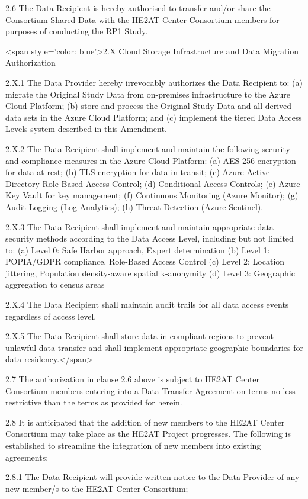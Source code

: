 \documentclass[12pt,letterpaper]{article}
\begin{document}
2.6	The Data Recipient is hereby authorised to transfer and/or share the Consortium Shared Data with the HE2AT Center Consortium members for purposes of conducting the RP1 Study. 

<span style='color: blue'>2.X Cloud Storage Infrastructure and Data Migration Authorization

2.X.1 The Data Provider hereby irrevocably authorizes the Data Recipient to: (a) migrate the Original Study Data from on-premises infrastructure to the Azure Cloud Platform; (b) store and process the Original Study Data and all derived data sets in the Azure Cloud Platform; and (c) implement the tiered Data Access Levels system described in this Amendment.

2.X.2 The Data Recipient shall implement and maintain the following security and compliance measures in the Azure Cloud Platform: (a) AES-256 encryption for data at rest; (b) TLS encryption for data in transit; (c) Azure Active Directory Role-Based Access Control; (d) Conditional Access Controls; (e) Azure Key Vault for key management; (f) Continuous Monitoring (Azure Monitor); (g) Audit Logging (Log Analytics); (h) Threat Detection (Azure Sentinel).

2.X.3 The Data Recipient shall implement and maintain appropriate data security methods according to the Data Access Level, including but not limited to: (a) Level 0: Safe Harbor approach, Expert determination (b) Level 1: POPIA/GDPR compliance, Role-Based Access Control (c) Level 2: Location jittering, Population density-aware spatial k-anonymity (d) Level 3: Geographic aggregation to census areas

2.X.4 The Data Recipient shall maintain audit trails for all data access events regardless of access level.

2.X.5 The Data Recipient shall store data in compliant regions to prevent unlawful data transfer and shall implement appropriate geographic boundaries for data residency.</span>

2.7	The authorization in clause 2.6 above is subject to HE2AT Center Consortium members entering into a Data Transfer Agreement on terms no less restrictive than the terms as provided for herein.  

2.8	It is anticipated that the addition of new members to the HE2AT Center Consortium may take place as the HE2AT Project progresses. The following is established to streamline the integration of new members into existing agreements:

2.8.1	The Data Recipient will provide written notice to the Data Provider of any new member/s to the HE2AT Center Consortium; 
\end{document}
